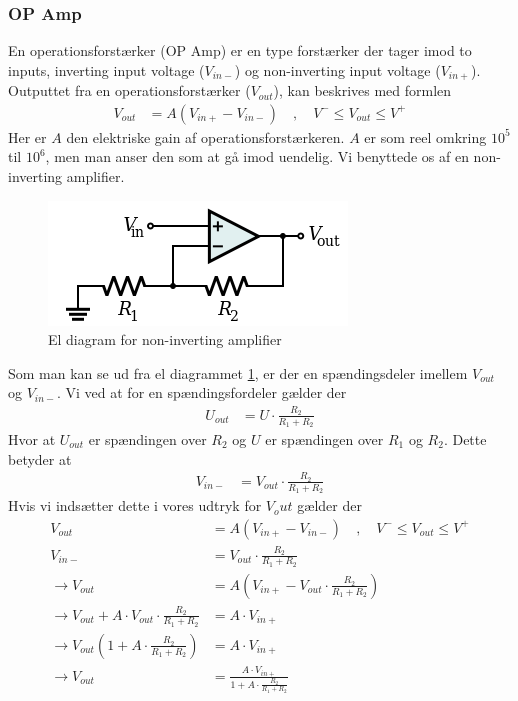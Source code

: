 \subsubsection{OP Amp}\label{sec:OPAMP}

En operationsforstærker (OP Amp) er en type forstærker der tager imod to inputs, inverting input voltage ($V_{in-}$) og non-inverting input voltage ($V_{in+}$). Outputtet fra en operationsforstærker  ($V_{out}$), kan beskrives med formlen
\begin{align}
V_{out}&=A(V_{in+}-V_{in-})\quad,\quad V^- \leq V_{out}\leq V^+ 
\end{align}
Her er $A$ den elektriske gain af operationsforstærkeren. $A$ er som reel omkring $10^5$ til $10^6$, men man anser den som at gå imod uendelig. Vi benyttede os af en non-inverting amplifier. 
\begin{figure}[H]
	\centering
    \includegraphics[width=\textwidth]{figures/komponenter/NonInvAmp}
	\caption{El diagram for non-inverting amplifier}
	\label{fig:noninvamp}	
\end{figure}
Som man kan se ud fra el diagrammet \ref{fig:noninvamp}, er der en spændingsdeler imellem $V_{out}$ og $V_{in-}$. Vi ved at for en spændingsfordeler gælder der
\begin{align}
U_{out}&=U\cdot \frac{R_2}{R_1+R_2}
\end{align}
Hvor at $U_{out}$ er spændingen over $R_2$ og $U$ er spændingen over $R_1$ og $R_2$.
Dette betyder at
\begin{align}
V_{in-}&=V_{out}\cdot \frac{R_2}{R_1+R_2}
\end{align}
Hvis vi indsætter dette i vores udtryk for $V_out$ gælder der
\begin{align}
V_{out}&=A(V_{in+}-V_{in-})\quad,\quad V^- \leq V_{out}\leq V^+\\
V_{in-}&=V_{out}\cdot \frac{R_2}{R_1+R_2}\\
\rightarrow V_{out}&= A(V_{in+}-V_{out}\cdot \frac{R_2}{R_1+R_2})\\
\rightarrow V_{out}+A\cdot V_{out}\cdot \frac{R_2}{R_1+R_2}&=A\cdot V_{in+}\\
\rightarrow V_{out}(1+A\cdot \frac{R_2}{R_1+R_2})&=A\cdot V_{in+}\\
\rightarrow V_{out}&=\frac{A\cdot V_{in+}}{1+A\cdot \frac{R_2}{R_1+R_2}}\\
\end{align}
